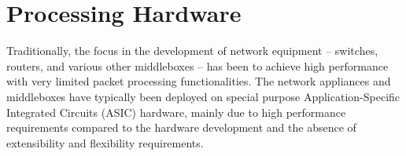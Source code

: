 


\section{Processing Hardware}
\label{sec:hardware-architecture}




Traditionally, the focus in the development of network equipment -- switches, routers, and various other middleboxes -- has been to achieve high performance with very limited packet processing functionalities. The network appliances and middleboxes have typically been deployed on special purpose Application-Specific Integrated Circuits (ASIC) hardware, mainly due to high performance requirements compared to the hardware development and the absence of extensibility and flexibility requirements.~\cite{Dobrescu:2009:REP}

